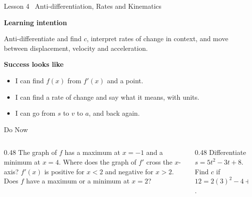 \documentclass[aspectratio=169,11pt,t,xcolor=table]{beamer}
\begin{document}
\begin{frame}{Lesson 4 \textperiodcentered\ Anti-differentiation, Rates and Kinematics}\relax
\vskip6mm
{\sEmph\bfseries Learning intention\par}\vskip2mm
Anti-differentiate and find $c$, interpret rates of change in context, and move between displacement, velocity and acceleration.
\vskip6mm
{\sEmph\bfseries Success looks like\par}\vskip2mm
\begin{itemize}
\item I can find $f(x)$ from $f'(x)$ and a point.
\item I can find a rate of change and say what it means, with units.
\item I can go from $s$ to $v$ to $a$, and back again.
\end{itemize}
\end{frame}

\begin{frame}{Do Now}\relax
\begin{columns}[T]
\begin{column}{0.48\textwidth}
 The graph of $f$ has a maximum at $x=-1$ and a minimum at $x=4$. Where does the graph of $f'$ cross the $x$-axis?
\vskip5mm
 $f'(x)$ is positive for $x<2$ and negative for $x>2$. Does $f$ have a maximum or a minimum at $x=2$?
\end{column}
\begin{column}{0.48\textwidth}
 Differentiate $s=5t^{2}-3t+8$.
\vskip5mm
 Find $c$ if $12=2(3)^{2}-4+c$.
\end{column}
\end{columns}
\end{frame}
\end{document}
